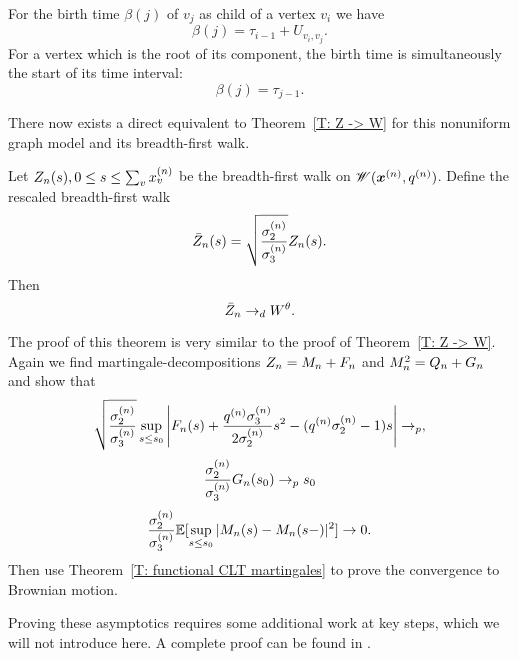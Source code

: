 For the birth time $\beta(j)$ of $v_j$ as child of a vertex $v_i$ we have
\begin{equation}
	\beta(j) = \tau_{i-1} + U_{v_i, v_j}.
\end{equation}
For a vertex which is the root of its component, the birth time is simultaneously the start of its time interval:
\begin{equation}
	\beta(j) = \tau_{j-1}.
\end{equation}


There now exists a direct equivalent to Theorem~\ref{T: Z -> W} for this nonuniform graph model and its breadth-first walk.

\begin{theorem} \label{T: Z -> W nonu}
	Let $Z_n(s), 0 \leq s \leq \sum_{v} x^{(n)}_v$ be the breadth-first walk on $\mathscr{W}(\boldsymbol{x}^{(n)}, q^{(n)})$.
	Define the rescaled breadth-first walk
	\begin{equation}
		\bar{Z}_n(s) = \sqrt{\frac{\sigma^{(n)}_2}{\sigma^{(n)}_3}} Z_n(s).
	\end{equation}
	Then
	\begin{equation}
		\bar{Z}_n \rightarrow_d W^{\theta}.
	\end{equation}	
\end{theorem}

The proof of this theorem is very similar to the proof of Theorem~\ref{T: Z -> W}.
Again we find martingale-decompositions $Z_n = M_n + F_n$ and $M_n^2 = Q_n + G_n$
and show that
\begin{equation}
	\sqrt{\frac{\sigma^{(n)}_2}{\sigma^{(n)}_3}} \sup_{s \leq s_0} \left| F_n(s) + \frac{q^{(n)}\sigma^{(n)}_3}{2\sigma^{(n)}_2}s^2 - (q^{(n)}\sigma^{(n)}_2 - 1)s \right| \rightarrow_p,
\end{equation}
\begin{equation}
\frac{\sigma^{(n)}_2}{\sigma^{(n)}_3} G_n(s_0) \rightarrow_p s_0
\end{equation}
\begin{equation}
\frac{\sigma^{(n)}_2}{\sigma^{(n)}_3} \mathbb{E}[  \sup_{s \leq s_0} | M_n(s) - M_n(s-) |^2] \rightarrow 0.
\end{equation}
Then use Theorem~\ref{T: functional CLT martingales} to prove the convergence to Brownian motion.

Proving these asymptotics requires some additional work at key steps,
which we will not introduce here.
A complete proof can be found in \cite[p.828ff.]{Aldous.1997}.

